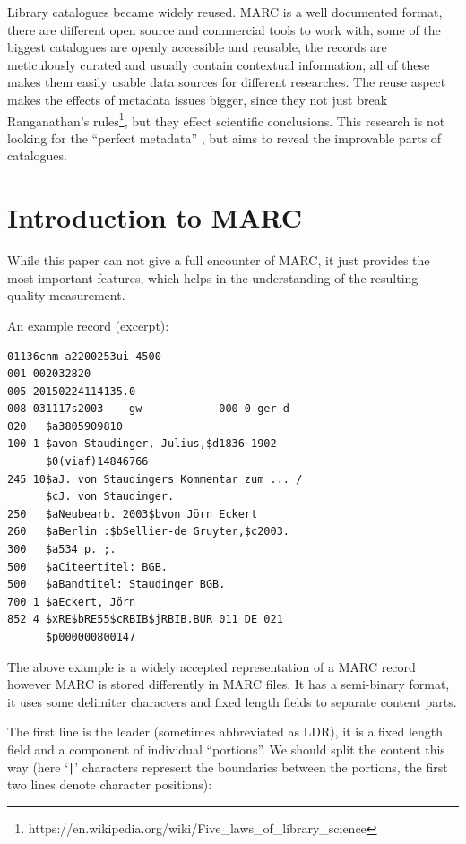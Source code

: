 Library catalogues became widely reused. MARC is a well documented format, there are different open source and commercial tools to work with, some of the biggest catalogues are openly accessible and reusable, the records are meticulously curated and usually contain contextual information, all of these makes them easily usable data sources for different researches. The reuse aspect makes the effects of metadata issues bigger, since they not just break Ranganathan's rules\footnote{https://en.wikipedia.org/wiki/Five\_laws\_of\_library\_science}, but they effect scientific conclusions. This research is not looking for the ``perfect metadata'' \cite{bade2008}, but aims to reveal the improvable parts of catalogues.

\section{Introduction to MARC}

While this paper can not give a full encounter of MARC, it just provides the most important features, which helps in the understanding of the resulting quality measurement. 

An example record (excerpt):

\begin{small}
\begin{Verbatim}[samepage=true]
01136cnm a2200253ui 4500
001 002032820
005 20150224114135.0
008 031117s2003    gw            000 0 ger d
020   $a3805909810
100 1 $avon Staudinger, Julius,$d1836-1902
      $0(viaf)14846766
245 10$aJ. von Staudingers Kommentar zum ... /
      $cJ. von Staudinger.
250   $aNeubearb. 2003$bvon Jörn Eckert
260   $aBerlin :$bSellier-de Gruyter,$c2003.
300   $a534 p. ;.
500   $aCiteertitel: BGB.
500   $aBandtitel: Staudinger BGB.
700 1 $aEckert, Jörn
852 4 $xRE$bRE55$cRBIB$jRBIB.BUR 011 DE 021
      $p000000800147
\end{Verbatim}
\end{small}

The above example is a widely accepted representation of a MARC record however MARC is stored differently in MARC files. It has a semi-binary format, it uses some delimiter characters and fixed length fields to separate content parts. 

The first line is the leader (sometimes abbreviated as LDR), it is a fixed length field and a component of individual ``portions''. We should split the content this way (here `\texttt{|}' characters represent the boundaries between the portions, the first two lines denote character positions):

